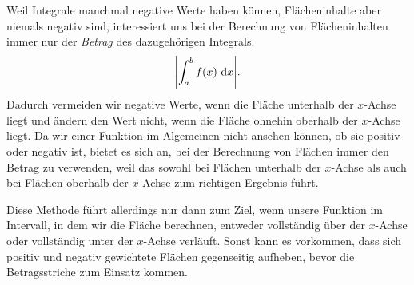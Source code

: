 \documentclass[../../main.tex]{subfiles}
\begin{document}
Weil Integrale manchmal negative Werte haben können, Flächeninhalte aber niemals negativ sind, interessiert uns bei der
Berechnung von Flächeninhalten immer nur der \emph{Betrag} des dazugehörigen Integrals.
\[\Biggl|\int_a^bf(x)\mathop{}\mathrm{d} x\Biggr|.\] 
Dadurch vermeiden wir negative
Werte, wenn die Fläche unterhalb der $x$-Achse liegt und ändern den Wert nicht, wenn die Fläche ohnehin oberhalb der
$x$-Achse liegt. Da wir einer Funktion im Algemeinen nicht ansehen können, ob sie positiv oder negativ ist, bietet es
sich an, bei der Berechnung von Flächen immer den Betrag zu verwenden, weil das sowohl bei Flächen unterhalb der
$x$-Achse als auch bei Flächen oberhalb der $x$-Achse zum richtigen Ergebnis führt.

Diese Methode führt allerdings nur dann zum Ziel, wenn unsere Funktion im Intervall, in dem wir die Fläche berechnen,
entweder vollständig über der $x$-Achse oder vollständig unter der $x$-Achse verläuft. Sonst kann es vorkommen, dass
sich positiv und negativ gewichtete Flächen gegenseitig aufheben, bevor die Betragsstriche zum Einsatz kommen.
\end{document}
